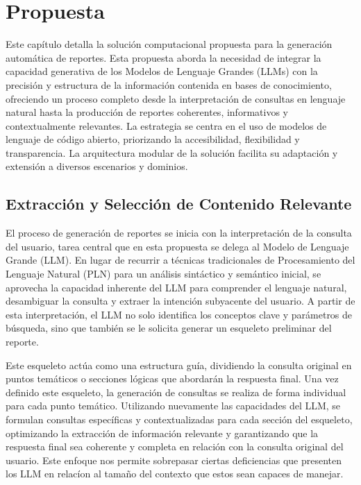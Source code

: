 \chapter{Propuesta}\label{chapter:proposal}

Este capítulo detalla la solución computacional propuesta para la generación automática de reportes. Esta propuesta aborda la necesidad de integrar la capacidad generativa de los Modelos de Lenguaje Grandes (LLMs) con la precisión y estructura de la información contenida en bases de conocimiento, ofreciendo un proceso completo desde la interpretación de consultas en lenguaje natural hasta la producción de reportes coherentes, informativos y contextualmente relevantes. La estrategia se centra en el uso de modelos de lenguaje de código abierto, priorizando la accesibilidad, flexibilidad y transparencia. La arquitectura modular de la solución facilita su adaptación y extensión a diversos escenarios y dominios.

\section{Extracción y Selección de Contenido Relevante}

El proceso de generación de reportes se inicia con la interpretación de la consulta del usuario, tarea central que en esta propuesta se delega al Modelo de Lenguaje Grande (LLM). En lugar de recurrir a técnicas tradicionales de Procesamiento del Lenguaje Natural (PLN) para un análisis sintáctico y semántico inicial, se aprovecha la capacidad inherente del LLM para comprender el lenguaje natural, desambiguar la consulta y extraer la intención subyacente del usuario. A partir de esta interpretación, el LLM no solo identifica los conceptos clave y parámetros de búsqueda, sino que también se le solicita generar un esqueleto preliminar del reporte.

Este esqueleto actúa como una estructura guía, dividiendo la consulta original en puntos temáticos o secciones lógicas que abordarán la respuesta final. Una vez definido este esqueleto, la generación de consultas se realiza de forma individual para cada punto temático. Utilizando nuevamente las capacidades del LLM, se formulan consultas específicas y contextualizadas para cada sección del esqueleto, optimizando la extracción de información relevante y garantizando que la respuesta final sea coherente y completa en relación con la consulta original del usuario. Este enfoque nos permite sobrepasar ciertas deficiencias que presenten los LLM en relacíon al tamaño del contexto que estos sean capaces de manejar.

